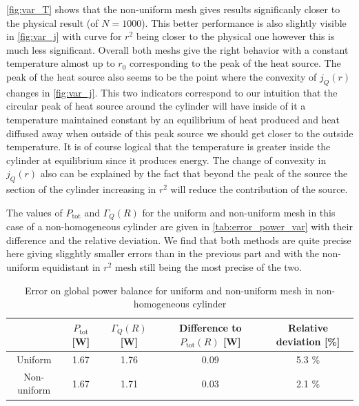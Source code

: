 \autoref{fig:var_T} shows that the non-uniform mesh gives results significanly closer to the physical result (of $N=1000$). This better performance is also slightly visible in \autoref{fig:var_j} with curve for $r^2$ being closer to the physical one however this is much less significant. Overall both meshs give the right behavior with a constant temperature almost up to $r_0$ corresponding to the peak of the heat source. The peak of the heat source also seems to be the point where the convexity of $j_Q(r)$ changes in \autoref{fig:var_j}. This two indicators correspond to our intuition that the circular peak of heat source around the cylinder will have inside of it a temperature maintained constant by an equilibrium of heat produced and heat diffused away when outside of this peak source we should get closer to the outside temperature. It is of course logical that the temperature is greater inside the cylinder at equilibrium since it produces energy. The change of convexity in $j_Q(r)$ also can be explained by the fact that beyond the peak of the source the section of the cylinder increasing in $r^2$ will reduce the contribution of the source.

The values of $P_\mathrm{tot}$ and $\Gamma_Q(R)$ for the uniform and non-uniform mesh in this case of a non-homogeneous cylinder are given in \autoref{tab:error_power_var} with their difference and the relative deviation. We find that both methods are quite precise here giving sligghtly smaller errors than in the previous part and with the non-uniform equidistant in $r^2$ mesh still being the most precise of the two.
\begin{table}[h]
    \centering
    \begin{tabulary}{\linewidth}{C|C C C C}
        \toprule
        & \(P_\textrm{tot}\) [\si{\watt}] & \(\Gamma_Q(R)\) [\si{\watt}] & Difference to \(P_\textrm{tot}(R)\) [\si{\watt}] & Relative deviation [\%] \\
        \midrule
        Uniform & 1.67 & 1.76 & 0.09 & 5.3 \% \\
        Non-uniform & 1.67 & 1.71 & 0.03 & 2.1 \% \\
        \bottomrule
    \end{tabulary}
    \caption{Error on global power balance for uniform and non-uniform mesh in non-homogeneous cylinder}
    \label{tab:error_power_var}
\end{table}



